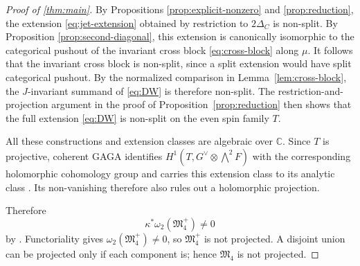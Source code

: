 \documentclass[11pt,a4paper,dvipsnames]{amsart}
\numberwithin{equation}{section}
\theoremstyle{plain}
\theoremstyle{definition}
\newcommand{\M}{\mathfrak M}
\newcommand{\CC}{\mathbb C}
\begin{document}
\begin{proof}[Proof of \cref{thm:main}]

By Propositions \ref{prop:explicit-nonzero} and \ref{prop:reduction}, the extension
\eqref{eq:jet-extension} obtained by restriction to $2\Delta_C$ is
non-split.  By Proposition \ref{prop:second-diagonal}, this extension is canonically
isomorphic to the categorical pushout of the invariant cross block
\eqref{eq:cross-block} along $\mu$.  It follows that the invariant cross
block is non-split, since a split extension would have split categorical
pushout.  By the normalized comparison in Lemma~\ref{lem:cross-block},
the $J$-invariant summand of \eqref{eq:DW} is therefore non-split.
The restriction-and-projection argument in the proof of
Proposition~\ref{prop:reduction} then shows that the full extension
\eqref{eq:DW} is non-split on the even spin family $T$.

All these constructions and extension classes are algebraic over
$\CC$.  Since $T$ is projective, coherent GAGA identifies
$H^1(T,G^\vee\otimes\bigwedge^2F)$ with the corresponding holomorphic
cohomology group and carries this extension class to its analytic class
\cite{SerreGAGA}.  Its non-vanishing therefore also rules out a
holomorphic projection.

Therefore
$$
 \kappa^*\omega_2(\M_4^+)\neq0
$$
by \cite[Theorem~3.2]{DonagiWittenAtiyah}.  Functoriality gives
$\omega_2(\M_4^+)\neq0$, so $\M_4^+$ is not projected.  A disjoint union
can be projected only if each component is; hence $\M_4$ is not projected.
\end{proof}
\end{document}
